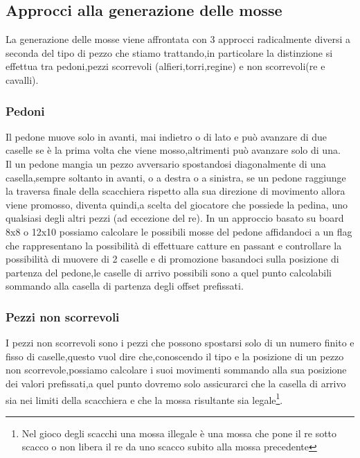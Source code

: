 \subsection{Approcci alla generazione delle mosse}
La generazione delle mosse viene affrontata con 3 approcci radicalmente diversi a seconda del tipo di pezzo che stiamo trattando,in particolare la distinzione si effettua tra 
pedoni,pezzi scorrevoli (alfieri,torri,regine) e non scorrevoli(re e cavalli).

\subsubsection{Pedoni}
Il pedone muove solo in avanti, mai indietro o di lato e può avanzare  di due caselle se è la prima volta che viene mosso,altrimenti può avanzare solo di una.
\\Il un pedone mangia un pezzo avversario spostandosi diagonalmente di una casella,sempre soltanto in avanti, o a destra o a sinistra, se un pedone raggiunge la traversa finale della scacchiera rispetto alla sua direzione di movimento
allora viene promosso, diventa quindi,a scelta del giocatore che possiede la pedina, uno qualsiasi degli altri pezzi  (ad eccezione del re).
In un approccio basato su board 8x8 o 12x10 possiamo calcolare le possibili mosse del pedone affidandoci a un flag che rappresentano la possibilità di effettuare catture en passant e controllare la possibilità 
di muovere di 2 caselle e di promozione basandoci sulla posizione di partenza del pedone,le caselle di arrivo possibili sono a quel punto calcolabili sommando alla casella di partenza degli offset prefissati.



\subsubsection{Pezzi non scorrevoli}
I pezzi non scorrevoli sono i pezzi che possono spostarsi solo di un numero finito e fisso di caselle,questo vuol dire che,conoscendo il tipo e la posizione di un pezzo non scorrevole,possiamo calcolare i suoi movimenti
sommando alla sua posizione dei valori prefissati,a quel punto dovremo solo assicurarci che la casella di arrivo sia nei limiti della scacchiera e che la mossa risultante sia legale\footnote{Nel gioco degli scacchi una mossa illegale è una mossa che pone il re sotto scacco o non libera il re da uno scacco subito alla mossa precedente}.

